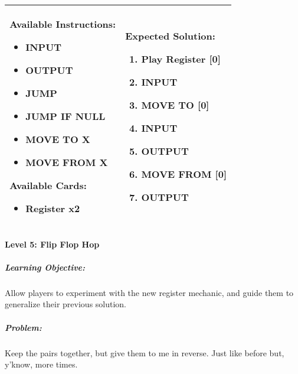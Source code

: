 \begin{center}
    \begin{tabular}{ | m{6cm} | m{8cm} | } 
        \hline
            \textbf{Available Instructions:} 
            \begin{itemize}
                \setlength\itemsep{-.35em}
                \item INPUT
                \item OUTPUT
                \item JUMP
                \item JUMP IF NULL
                \item MOVE TO X
                \item MOVE FROM X
            \end{itemize}
            \textbf{Available Cards:} 
            \begin{itemize}
                \setlength\itemsep{-.35em}
                \item Register x2
            \end{itemize}& 
            \textbf{Expected Solution:} 
            \begin{enumerate}
                \setlength\itemsep{-.35em}
                \item Play Register [0]
                \item INPUT
                \item MOVE TO [0]
                \item INPUT
                \item OUTPUT
                \item MOVE FROM [0] 
                \item OUTPUT
            \end{enumerate}
            \\
        \hline
    \end{tabular}
\end{center}


\paragraph{Level 5: Flip Flop Hop}
\subparagraph{Learning Objective:} Allow players to experiment with the new register mechanic, and guide them to generalize their previous solution.

\subparagraph{Problem:} Keep the pairs together, but give them to me in reverse. Just like before but, y'know, more times.

